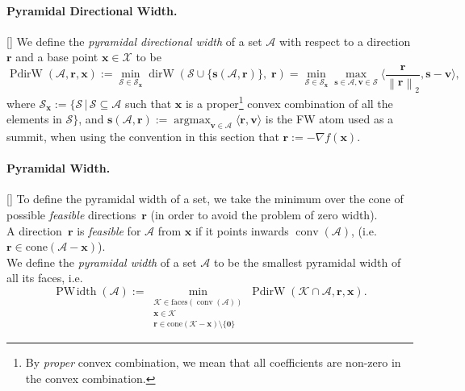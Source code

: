 \documentclass[twoside]{article}
\newcommand{\X}{\mathcal{X}}
\newcommand{\x}{\bm{x}}
\newcommand{\s}{\bm{s}}
\renewcommand{\SS}{ \bm{S}}
\DeclareMathOperator*{\conv}{conv}
\DeclareMathOperator*{\argmax}{\arg\max}
\providecommand{\normEucl}[1]{\left\lVert#1\right\rVert_2}
\newcommand{\domain}{\mathcal{\X}} %
\newcommand{\dirW}{\mathop{dirW}}
\newcommand{\vv}{\bm{v}} %
\newcommand{\A}{\mathcal{A}}
\renewcommand{\SS}{\mathcal{S}}
\renewcommand{\r}{\bm{r}}
\newcommand{\PdirW}{\mathop{PdirW}}
\newcommand{\PWidth}{\mathop{PW\!idth}}
\newcommand{\innerProdCompressed}[2]{\langle #1 , #2 \rangle}
\newcommand{\Kface}{\mathcal{K}}
\newcommand{\0}{\mathbf{0}} %
\begin{document}
  \paragraph{Pyramidal Directional Width.}[\citet{lacoste2015global}] We define the \emph{pyramidal directional
  width} of a set $\A$ with respect to a direction $\r$ and a base point
  $\x \in \domain$ to be
  \begin{equation} \label{eq:TruePdirW}
  \PdirW(\A,\r, \x) := \min_{\SS \in \SS_{\x}} \dirW( \SS \cup
  \{\s(\A,\r) \} , \; \r) = \min_{\SS \in \SS_{\x}} \max_{\s \in
  \A, \vv \in \SS} \textstyle \big\langle \frac{\r}{\normEucl{\r}}, \s - \vv \big\rangle
  ,
  \end{equation}
  where $\SS_{\x} := \{ \SS \, | \, \SS \subseteq \A$ such that $\x$ is a
  proper\footnote{By \emph{proper} convex combination, we mean that all
  coefficients are non-zero in the convex combination.} convex combination of
  all the elements in $\SS\}$, and $\s(\A,\r) := \argmax_{\vv \in
  \A} \innerProdCompressed{\r}{\vv}$ is the FW atom used as a summit, when using the convention in this section that $\r := -\nabla f(\x)$. 


  \paragraph{Pyramidal Width.}[\citet{lacoste2015global}]
  To define the pyramidal width of a set, we take the minimum over the cone of
  possible \emph{feasible} directions~$\r$ (in order to avoid the problem of zero width).\\
  A direction~$\r$ is \emph{feasible} for $\A$ from $\x$ if it points inwards $\conv(\A)$, 
  (i.e. $\r \in \text{cone}(\A-\x)$).\\
  We define the \emph{pyramidal width} of a set $\A$ to be the smallest pyramidal width of all its faces, i.e.
  \begin{equation} \label{eq:Pwidth}
  \PWidth(\A) := \displaystyle \min_{\substack{\Kface \in \textrm{faces}(\conv(\A)) \\
                            \x \in \Kface \\
                            \r \in \text{cone}(\Kface-\x) \setminus \{\0\}} 
                                     } \PdirW(\Kface \cap \A,\r, \x)                   .                               
  \end{equation}
\end{document}
